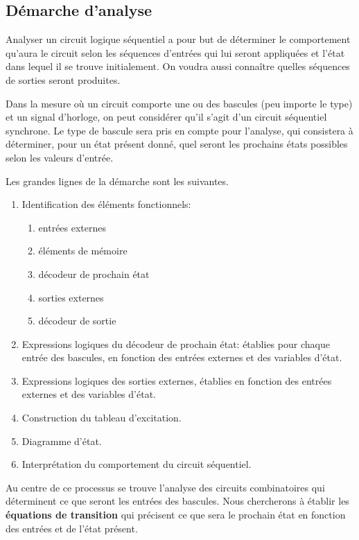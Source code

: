 \documentclass[11pt]{article}
\begin{document}
\subsection{Démarche d'analyse}
\label{sec:orgf378c9b}

Analyser un circuit logique séquentiel a pour but de déterminer le
comportement qu'aura le circuit selon les séquences d'entrées qui lui
seront appliquées et l'état dans lequel il se trouve initialement. On
voudra aussi connaître quelles séquences de sorties seront produites.

Dans la mesure où un circuit comporte une ou des bascules (peu importe
le type) et un signal d'horloge, on peut considérer qu'il s'agit d'un
circuit séquentiel synchrone. Le type de bascule sera pris en compte
pour l'analyse, qui consistera à déterminer, pour un état présent
donné, quel seront les prochains états possibles selon les valeurs
d'entrée.

Les grandes lignes de la démarche sont les suivantes.

\begin{enumerate}
\item Identification des éléments fonctionnels:

\begin{enumerate}
\item entrées externes

\item éléments de mémoire

\item décodeur de prochain état

\item sorties externes

\item décodeur de sortie
\end{enumerate}
\item Expressions logiques du décodeur de prochain état: établies pour
chaque entrée des bascules, en fonction des entrées externes et des
variables d'état.
\item Expressions logiques des sorties externes, établies en fonction des
entrées externes et des variables d'état.
\item Construction du tableau d'excitation.
\item Diagramme d'état.
\item Interprétation du comportement du circuit séquentiel.
\end{enumerate}

Au centre de ce processus se trouve l'analyse des circuits
combinatoires qui déterminent ce que seront les entrées des
bascules. Nous chercherons à établir les \textbf{équations de transition} qui
précisent ce que sera le prochain état en fonction des entrées et de
l'état présent.
\end{document}
